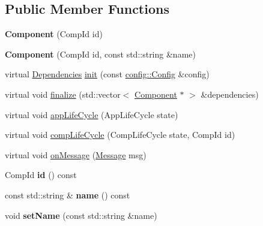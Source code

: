 \subsection*{Public Member Functions}
\begin{DoxyCompactItemize}
\item 
\hypertarget{classtheoria_1_1core_1_1Component_a64b1e60585ad8c0d12d9be814b37dda8}{{\bfseries Component} (Comp\+Id id)}\label{classtheoria_1_1core_1_1Component_a64b1e60585ad8c0d12d9be814b37dda8}

\item 
\hypertarget{classtheoria_1_1core_1_1Component_a719767a45a12a3d12670aadd83f5d292}{{\bfseries Component} (Comp\+Id id, const std\+::string \&name)}\label{classtheoria_1_1core_1_1Component_a719767a45a12a3d12670aadd83f5d292}

\item 
virtual \hyperlink{classtheoria_1_1core_1_1Dependencies}{Dependencies} \hyperlink{classtheoria_1_1core_1_1Component_a7ed45f6e38442a40666ae4556f794f7d}{init} (const \hyperlink{classtheoria_1_1config_1_1Config}{config\+::\+Config} \&config)
\item 
virtual void \hyperlink{classtheoria_1_1core_1_1Component_a0dadc51334ff054dad8169c594ebadb4}{finalize} (std\+::vector$<$ \hyperlink{classtheoria_1_1core_1_1Component}{Component} $\ast$ $>$ \&dependencies)
\item 
virtual void \hyperlink{classtheoria_1_1core_1_1Component_ae036cde9b803a621149efeff7e0e00fc}{app\+Life\+Cycle} (App\+Life\+Cycle state)
\item 
virtual void \hyperlink{classtheoria_1_1core_1_1Component_a92578e2b6253681a21b91e7c22b22975}{comp\+Life\+Cycle} (Comp\+Life\+Cycle state, Comp\+Id id)
\item 
virtual void \hyperlink{classtheoria_1_1core_1_1Component_a94991dc5bdf509df6d35bb218e4880eb}{on\+Message} (\hyperlink{classtheoria_1_1core_1_1Message}{Message} msg)
\item 
\hypertarget{classtheoria_1_1core_1_1Component_a6c123ce21724ea6eac2f66f355ac514a}{Comp\+Id {\bfseries id} () const }\label{classtheoria_1_1core_1_1Component_a6c123ce21724ea6eac2f66f355ac514a}

\item 
\hypertarget{classtheoria_1_1core_1_1Component_a69c1f8a3918c5a53d5343f38a53c781b}{const std\+::string \& {\bfseries name} () const }\label{classtheoria_1_1core_1_1Component_a69c1f8a3918c5a53d5343f38a53c781b}

\item 
\hypertarget{classtheoria_1_1core_1_1Component_a4c741f3d65b7d50bd56378bdc9cc9a62}{void {\bfseries set\+Name} (const std\+::string \&name)}\label{classtheoria_1_1core_1_1Component_a4c741f3d65b7d50bd56378bdc9cc9a62}


\end{DoxyCompactItemize}
